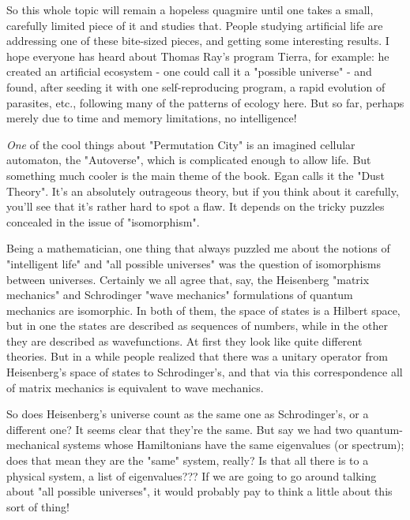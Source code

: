 So this whole topic will remain a hopeless quagmire until one takes
a small, carefully limited piece of it and studies that.  People
studying artificial life are addressing one of these bite-sized
pieces, and getting some interesting results.  I hope everyone
has heard about Thomas Ray's program Tierra, for example: he
created an artificial ecosystem - one could call it a "possible
universe" - and found, after seeding it with one self-reproducing
program, a rapid evolution of parasites, etc., following
many of the patterns of ecology here.  But so far, perhaps merely
due to time and memory limitations, no intelligence!  

\emph{One} of the cool things about "Permutation City" is an imagined 
cellular automaton, the "Autoverse", which is complicated enough to 
allow life.  But something much cooler is the main theme of the book.
Egan calls it the "Dust Theory".  It's an absolutely outrageous
theory, but if you think about it carefully, you'll see that it's
rather hard to spot a flaw.  It depends on the tricky
puzzles concealed in the issue of "isomorphism".

Being a mathematician, one thing that always puzzled me about
the notions of "intelligent life" and "all possible universes"
was the question of isomorphisms between universes.  Certainly
we all agree that, say, the Heisenberg "matrix mechanics"
and Schrodinger "wave mechanics" formulations of quantum mechanics 
are isomorphic.  In both of them, the space of states is a Hilbert
space, but in one the states are described as sequences of numbers, while in
the other they are described as wavefunctions.  At first they
look like quite different theories.  But in a while people
realized that there was a unitary operator from Heisenberg's space of 
states to Schrodinger's, and that via this correspondence
all of matrix mechanics is equivalent to wave mechanics.

So does Heisenberg's universe count as the same one as 
Schrodinger's, or a different one?  It seems clear that they're
the same.  But say we had two quantum-mechanical systems
whose Hamiltonians have the same eigenvalues (or spectrum); 
does that mean they are the "same" system, really?  Is that all
there is to a physical system, a list of eigenvalues??? If we are going to go
around talking about "all possible universes", it would probably
pay to think a little about this sort of thing!  

